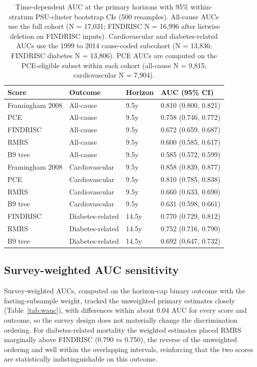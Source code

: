 \documentclass[11pt]{article}
\begin{document}
\begin{table}[h]
\centering
\caption{Time-dependent AUC at the primary horizons with 95\% within-stratum PSU-cluster bootstrap CIs (500 resamples). All-cause AUCs use the full cohort (N = 17{,}031; FINDRISC N = 16{,}996 after listwise deletion on FINDRISC inputs). Cardiovascular and diabetes-related AUCs use the 1999 to 2014 cause-coded subcohort (N = 13{,}836; FINDRISC diabetes N = 13{,}806). PCE AUCs are computed on the PCE-eligible subset within each cohort (all-cause N = 9{,}815; cardiovascular N = 7{,}904).}
\label{tab:auc}
\begin{tabular}{llll}
\toprule
Score & Outcome & Horizon & AUC (95\% CI) \\
\midrule
Framingham 2008 & All-cause & 9.5y & 0.810 (0.800, 0.821) \\
PCE & All-cause & 9.5y & 0.758 (0.746, 0.772) \\
FINDRISC & All-cause & 9.5y & 0.672 (0.659, 0.687) \\
RMRS & All-cause & 9.5y & 0.600 (0.585, 0.617) \\
B9 tree & All-cause & 9.5y & 0.585 (0.572, 0.599) \\
\midrule
Framingham 2008 & Cardiovascular & 9.5y & 0.858 (0.839, 0.877) \\
PCE & Cardiovascular & 9.5y & 0.810 (0.785, 0.838) \\
RMRS & Cardiovascular & 9.5y & 0.660 (0.633, 0.690) \\
B9 tree & Cardiovascular & 9.5y & 0.631 (0.598, 0.661) \\
\midrule
FINDRISC & Diabetes-related & 14.5y & 0.770 (0.729, 0.812) \\
RMRS & Diabetes-related & 14.5y & 0.752 (0.716, 0.790) \\
B9 tree & Diabetes-related & 14.5y & 0.692 (0.647, 0.732) \\
\bottomrule
\end{tabular}
\end{table}

\subsection*{Survey-weighted AUC sensitivity}

Survey-weighted AUCs, computed on the horizon-cap binary outcome with the fasting-subsample weight, tracked the unweighted primary estimates closely (Table~\ref{tab:wauc}), with differences within about 0.04 AUC for every score and outcome, so the survey design does not materially change the discrimination ordering. For diabetes-related mortality the weighted estimates placed RMRS marginally above FINDRISC (0.790 vs 0.750), the reverse of the unweighted ordering and well within the overlapping intervals, reinforcing that the two scores are statistically indistinguishable on this outcome.
\end{document}
